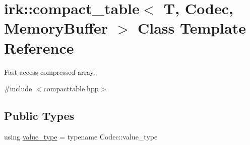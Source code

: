 \hypertarget{classirk_1_1compact__table}{}\section{irk\+:\+:compact\+\_\+table$<$ T, Codec, Memory\+Buffer $>$ Class Template Reference}
\label{classirk_1_1compact__table}


Fast-\/access compressed array.  




{\ttfamily \#include $<$compacttable.\+hpp$>$}

\subsection*{Public Types}
\begin{DoxyCompactItemize}
\item 
using \mbox{\hyperlink{classirk_1_1compact__table_accd2a370a48a5873af0625d56d732d71}{value\+\_\+type}} = typename Codec\+::value\+\_\+type
\end{DoxyCompactItemize}
